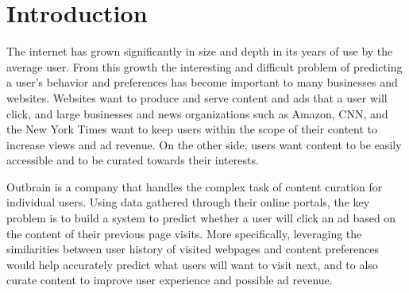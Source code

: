 \documentclass[fleqn,10pt]{SelfArx} %
\affiliation{\textit{Computer Science, School of Informatics and Computing, Indiana University, Bloomington, IN, USA}} %
\affiliation{\{jl216,andnpatt,mkschleg\}@indiana.edu} %
\begin{document}
\flushbottom %

\maketitle %

\tableofcontents %

\thispagestyle{empty} %


\section*{Introduction} %


The internet has grown significantly in size and depth in its years of use by the average user. From this growth the interesting and difficult problem of predicting a user’s behavior and preferences has become important to many businesses and websites. Websites want to produce and serve content and ads that a user will click, and large businesses and news organizations such as Amazon, CNN, and the New York Times want to keep users within the scope of their content to increase views and ad revenue. On the other side, users want content to be easily accessible and to be curated towards their interests.

Outbrain is a company that handles the complex task of content curation for individual users.  Using data gathered through their online portals, the key problem is to build a system to predict whether a user will click an ad based on the content of their previous page visits. More specifically, leveraging the similarities between user history of visited webpages and content preferences would help accurately predict what users will want to visit next, and to also curate content to improve user experience and possible ad revenue.
\end{document}
